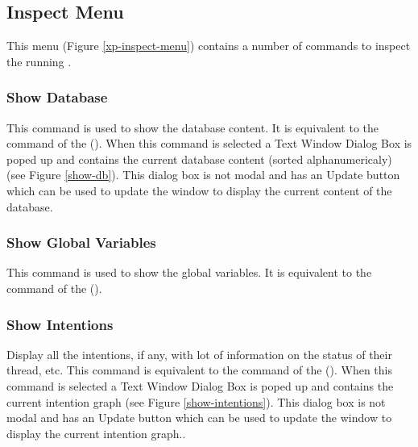 \subsection{Inspect Menu}


This menu (Figure \ref{xp-inspect-menu}) contains a number of commands to
inspect the running \XPK{}.



\subsubsection{Show Database}


This command is used to show the database content. It is equivalent to the
 command of the \CPK{} (). When this command is selected a Text Window Dialog Box is poped up
and contains the current database content (sorted alphanumericaly) (see Figure
\ref{show-db}). This dialog box is not modal and has an Update button which can
be used to update the window to display the current content of the database.

\subsubsection{Show Global Variables}

This command is used to show the global variables. It is equivalent to the
 command of the \CPK{} ().

\subsubsection{Show Intentions}


Display all the intentions, if any, with lot of information on the status of
their thread, etc. This command is equivalent to the 
command of the \CPK{} ().  When this
command is selected a Text Window Dialog Box is poped up and contains the
current intention graph (see Figure \ref{show-intentions}). This dialog box is
not modal and has an Update button which can be used to update the window to
display the current intention graph..


